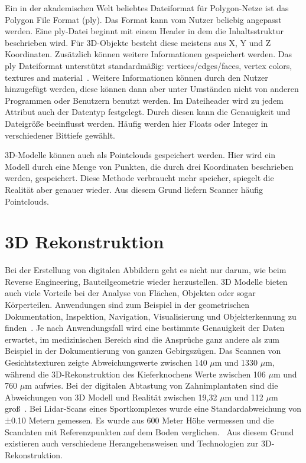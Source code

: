 Ein in der akademischen Welt beliebtes Dateiformat für Polygon-Netze ist das 
Polygon File Format (ply).
Das Format kann vom Nutzer beliebig angepasst werden. Eine ply-Datei beginnt mit 
einem Header in dem die Inhaltsstruktur beschrieben wird. 
Für 3D-Objekte besteht diese meistens aus X, Y und Z Koordinaten. 
Zusätzlich können weitere Informationen gespeichert werden. Das ply Dateiformat 
unterstützt standardmäßig: \glqq vertices/edges/faces, vertex colors, textures and
material\grqq ~\cite{KentonMchenry.2008}. Weitere Informationen können durch den Nutzer 
hinzugefügt werden, 
diese können dann aber unter Umständen nicht von anderen Programmen oder Benutzern
benutzt werden.
Im Dateiheader wird zu jedem Attribut auch der Datentyp festgelegt. Durch diesen 
kann die Genauigkeit und Dateigröße beeinflusst werden. Häufig werden hier Floats oder
Integer in verschiedener Bittiefe gewählt.

3D-Modelle können auch als Pointclouds gespeichert werden. Hier wird 
ein Modell durch eine Menge von Punkten, die durch drei Koordinaten beschrieben werden, 
gespeichert.
Diese Methode verbraucht mehr speicher, spiegelt die Realität aber genauer wieder.
Aus diesem Grund liefern Scanner häufig Pointclouds.~\cite{linsen2001point}

\section{3D Rekonstruktion} \label{3d_construction}

Bei der Erstellung von digitalen Abbildern geht es nicht nur darum, wie beim Reverse
Engineering, Bauteilgeometrie wieder herzustellen. 3D Modelle bieten auch viele 
Vorteile bei der Analyse von Flächen, Objekten oder sogar Körperteilen. 
Anwendungen sind zum Beispiel in der
geometrischen Dokumentation, Inspektion, Navigation, Visualisierung und 
Objekterkennung zu finden~\cite{Verykokou.2023}. Je nach Anwendungsfall wird eine
bestimmte Genauigkeit
der Daten erwartet, im medizinischen Bereich sind die Ansprüche ganz 
andere als zum Beispiel in der Dokumentierung von ganzen Gebirgszügen.
Das Scannen von Gesichtstexturen zeigte Abweichungswerte zwischen 140 $\mu$m und 
1330 $\mu$m, während die 3D-Rekonstruktion des Kieferknochens Werte zwischen 106 $\mu$m 
und 760 $\mu$m aufwies. 
Bei der digitalen Abtastung von Zahnimplantaten sind die Abweichungen von 
3D Modell und Realität zwischen 19,32 $\mu$m
und 112 $\mu$m groß~\cite{Bohner.2019}.
Bei Lidar-Scans eines Sportkomplexes wurde eine Standardabweichung von ±0.10 Metern
gemessen. Es wurde aus 600 Meter Höhe vermessen und die Scandaten mit 
Referenzpunkten auf dem Boden verglichen.~\cite{Elaksher.2023}
Aus diesem Grund existieren auch verschiedene Herangehensweisen und Technologien  
zur 3D-Rekonstruktion.

